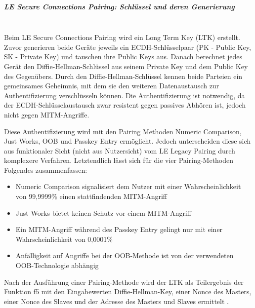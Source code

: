 \subparagraph{LE Secure Connections Pairing: Schlüssel und deren Generierung} \mbox{} \vspace{0.2cm} \\
Beim LE Secure Connections Pairing wird ein Long Term Key (LTK) erstellt. Zuvor generieren beide Geräte jeweils ein ECDH-Schlüsselpaar (PK - Public Key, SK - Private Key) und tauschen ihre Public Keys aus. Danach berechnet jedes Gerät den Diffie-Hellman-Schlüssel aus seinem Private Key und dem Public Key des Gegenübers. Durch den Diffie-Hellman-Schlüssel kennen beide Parteien ein gemeinsames Geheimnis, mit dem sie den weiteren Datenaustausch zur Authentifizierung verschlüsseln können. Die Authentifizierung ist notwendig, da der ECDH-Schlüsselaustausch zwar resistent gegen passives Abhören ist, jedoch nicht gegen MITM-Angriffe. \cite{BtSpec4.2_2307}

Diese Authentifizierung wird mit den Pairing Methoden Numeric Comparison, Just Works, OOB und Passkey Entry ermöglicht. Jedoch unterscheiden diese sich aus funktionaler Sicht (nicht aus Nutzersicht) vom LE Legacy Pairing durch komplexere Verfahren. Letztendlich lässt sich für die vier Pairing-Methoden Folgendes zusammenfassen: 
\begin{itemize}
    \item Numeric Comparison signalisiert dem Nutzer mit einer Wahrscheinlichkeit von 99,9999\% einen stattfindenden MITM-Angriff \cite{BtSpec4.2_2309}
    \item Just Works bietet keinen Schutz vor einem MITM-Angriff \cite{BtSpec4.2_245} 
    \item Ein MITM-Angriff während des Passkey Entry gelingt nur mit einer Wahrscheinlichkeit von 0,0001\% \cite{BtSpec4.2_2311}
    \item Anfälligkeit auf Angriffe bei der OOB-Methode ist von der verwendeten OOB-Technologie abhängig \cite{BtSpec4.2_2312-2313}
\end{itemize}

Nach der Ausführung einer Pairing-Methode wird der LTK als Teilergebnis der Funktion f5 \cite{BtSpec4.2_2292-2293} 
mit den Eingabewerten Diffie-Hellman-Key, einer Nonce des Masters, einer Nonce des Slaves und der Adresse des Masters und Slaves ermittelt \cite{BtSpec4.2_2314}.

